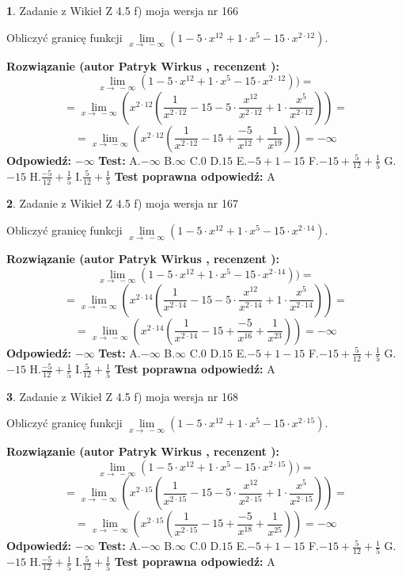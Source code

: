 \documentclass[12pt, a4paper]{article}
\theoremstyle{definition} %
\newtheorem{zad}{}
\newcommand{\zadStart}[1]{\begin{zad}#1\newline}
\newcommand{\zadStop}{\end{zad}}
\newcommand{\rozwStart}[2]{\noindent \textbf{Rozwiązanie (autor #1 , recenzent #2): }\newline}
\newcommand{\rozwStop}{\newline}
\newcommand{\odpStart}{\noindent \textbf{Odpowiedź:}\newline}
\newcommand{\odpStop}{\newline}
\newcommand{\testStart}{\noindent \textbf{Test:}\newline}
\newcommand{\testStop}{\newline}
\newcommand{\kluczStart}{\noindent \textbf{Test poprawna odpowiedź:}\newline}
\newcommand{\kluczStop}{\newline}
\begin{document}
\zadStart{Zadanie z Wikieł Z 4.5 f) moja wersja nr 166}



Obliczyć granicę funkcji  $\lim\limits_{x\to\ -\infty}(1 - 5 \cdot x^{12}+1 \cdot x^{5}- 15 \cdot x^{2\cdot12})$.
\zadStop
\rozwStart{Patryk Wirkus}{}
$$\lim\limits_{x\to\ -\infty}(1 - 5 \cdot x^{12}+1 \cdot x^{5}- 15 \cdot x^{2\cdot12}))=$$
$$=\lim\limits_{x\to\ -\infty}(x^{2\cdot12}(\frac{1}{x^{2\cdot12}}-15 -5 \cdot \frac{x^{12}}{x^{2\cdot12}}+1 \cdot \frac{x^{5}}{x^{2\cdot12}}))=$$
$$=\lim\limits_{x\to\ -\infty}(x^{2\cdot12}(\frac{1}{x^{2\cdot12}}-15 + \frac{-5}{x^{12}}+ \frac{1}{x^{19}}))=-\infty$$
\rozwStop
\odpStart
$-\infty$
\odpStop
\testStart
A.$-\infty$ B.$\infty$ C.$0$ D.$15$ E.$-5 + 1 - 15$
F.$-15+\frac{5}{12}+\frac{1}{5}$ G.$-15$
H.$\frac{-5}{12}+\frac{1}{5}$
I.$\frac{5}{12}+\frac{1}{5}$
\testStop
\kluczStart
A
\kluczStop



\zadStart{Zadanie z Wikieł Z 4.5 f) moja wersja nr 167}



Obliczyć granicę funkcji  $\lim\limits_{x\to\ -\infty}(1 - 5 \cdot x^{12}+1 \cdot x^{5}- 15 \cdot x^{2\cdot14})$.
\zadStop
\rozwStart{Patryk Wirkus}{}
$$\lim\limits_{x\to\ -\infty}(1 - 5 \cdot x^{12}+1 \cdot x^{5}- 15 \cdot x^{2\cdot14}))=$$
$$=\lim\limits_{x\to\ -\infty}(x^{2\cdot14}(\frac{1}{x^{2\cdot14}}-15 -5 \cdot \frac{x^{12}}{x^{2\cdot14}}+1 \cdot \frac{x^{5}}{x^{2\cdot14}}))=$$
$$=\lim\limits_{x\to\ -\infty}(x^{2\cdot14}(\frac{1}{x^{2\cdot14}}-15 + \frac{-5}{x^{16}}+ \frac{1}{x^{23}}))=-\infty$$
\rozwStop
\odpStart
$-\infty$
\odpStop
\testStart
A.$-\infty$ B.$\infty$ C.$0$ D.$15$ E.$-5 + 1 - 15$
F.$-15+\frac{5}{12}+\frac{1}{5}$ G.$-15$
H.$\frac{-5}{12}+\frac{1}{5}$
I.$\frac{5}{12}+\frac{1}{5}$
\testStop
\kluczStart
A
\kluczStop



\zadStart{Zadanie z Wikieł Z 4.5 f) moja wersja nr 168}



Obliczyć granicę funkcji  $\lim\limits_{x\to\ -\infty}(1 - 5 \cdot x^{12}+1 \cdot x^{5}- 15 \cdot x^{2\cdot15})$.
\zadStop
\rozwStart{Patryk Wirkus}{}
$$\lim\limits_{x\to\ -\infty}(1 - 5 \cdot x^{12}+1 \cdot x^{5}- 15 \cdot x^{2\cdot15}))=$$
$$=\lim\limits_{x\to\ -\infty}(x^{2\cdot15}(\frac{1}{x^{2\cdot15}}-15 -5 \cdot \frac{x^{12}}{x^{2\cdot15}}+1 \cdot \frac{x^{5}}{x^{2\cdot15}}))=$$
$$=\lim\limits_{x\to\ -\infty}(x^{2\cdot15}(\frac{1}{x^{2\cdot15}}-15 + \frac{-5}{x^{18}}+ \frac{1}{x^{25}}))=-\infty$$
\rozwStop
\odpStart
$-\infty$
\odpStop
\testStart
A.$-\infty$ B.$\infty$ C.$0$ D.$15$ E.$-5 + 1 - 15$
F.$-15+\frac{5}{12}+\frac{1}{5}$ G.$-15$
H.$\frac{-5}{12}+\frac{1}{5}$
I.$\frac{5}{12}+\frac{1}{5}$
\testStop
\kluczStart
A
\kluczStop
\end{document}
